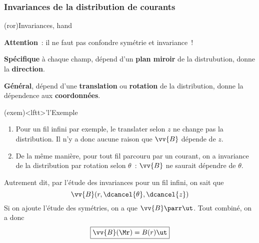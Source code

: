 \documentclass[../../main/main.tex]{subfiles}
\begin{document}
\subsubsection{Invariances de la distribution de courants}
\label{sssec:invdist}
\begin{tcb}(ror){Invariances, hand}
	\begin{center}
		\vspace{12pt}
		\smallbreak
		\textbf{Attention}~: il ne faut pas confondre symétrie et invariance~!
	\end{center}
	\begin{minipage}[]{.45\linewidth}
		\begin{center}
		\end{center}
		\textbf{Spécifique} à chaque champ, dépend d'un \textbf{plan miroir} de la
		distrubution, donne la \textbf{direction}.
	\end{minipage}
	\hfill
	\begin{minipage}[]{.45\linewidth}
		\begin{center}
		\end{center}
		\textbf{Général}, dépend d'une \textbf{translation} ou \textbf{rotation} de
		la distribution, donne la dépendence aux \textbf{coordonnées}.
	\end{minipage}
\end{tcb}

\begin{tcb}(exem)<lftt>'l'{Exemple}
	\begin{enumerate}
		\item Pour un fil infini par exemple, le translater selon $z$ ne change pas
		      la distribution. Il n'y a donc aucune raison que $\vv{B}$ dépende de $z$.
		\item De la même manière, pour tout fil parcouru par un courant, on a
		      invariance de la distribution par rotation selon $\theta$~: $\vv{B}$ ne
		      saurait dépendre de $\theta$.
	\end{enumerate}
	Autrement dit, par l'étude des invariances pour un fil infini, on
	sait que
	\[
		\vv{B}(r,\dcancel{\theta},\dcancel{z})
	\]
	Si on ajoute l'étude des symétries, on a que $\vv{B}\parr \ut$. Tout combiné,
	on a donc
	\[
		\boxed{\vv{B}(\Mr) = B(r)\ut}
	\]
\end{tcb}
\end{document}
